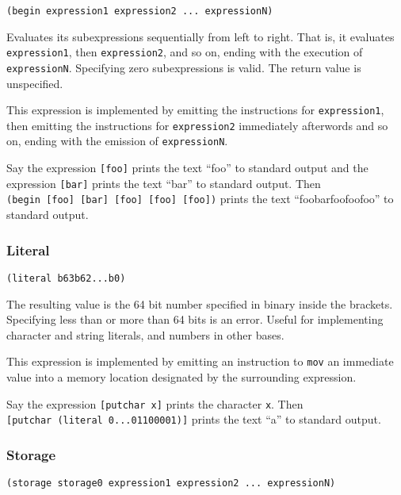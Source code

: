 \documentclass[]{article}
\begin{document}
\begin{verbatim}
(begin expression1 expression2 ... expressionN)
\end{verbatim}

Evaluates its subexpressions sequentially from left to right. That is,
it evaluates \texttt{expression1}, then \texttt{expression2}, and so on,
ending with the execution of \texttt{expressionN}. Specifying zero
subexpressions is valid. The return value is unspecified.

This expression is implemented by emitting the instructions for
\texttt{expression1}, then emitting the instructions for
\texttt{expression2} immediately afterwords and so on, ending with the
emission of \texttt{expressionN}.

Say the expression \texttt{{[}foo{]}} prints the text ``foo'' to
standard output and the expression \texttt{{[}bar{]}} prints the text
``bar'' to standard output. Then
\texttt{(begin\ {[}foo{]}\ {[}bar{]}\ {[}foo{]}\ {[}foo{]}\ {[}foo{]})}
prints the text ``foobarfoofoofoo'' to standard output.

\hypertarget{literal}{\subsubsection{Literal}\label{literal}}

\begin{verbatim}
(literal b63b62...b0)
\end{verbatim}

The resulting value is the 64 bit number specified in binary inside the
brackets. Specifying less than or more than 64 bits is an error. Useful
for implementing character and string literals, and numbers in other
bases.

This expression is implemented by emitting an instruction to
\texttt{mov} an immediate value into a memory location designated by the
surrounding expression.

Say the expression \texttt{{[}putchar\ x{]}} prints the character
\texttt{x}. Then \texttt{{[}putchar\ (literal\ 0...01100001){]}} prints
the text ``a'' to standard output.

\hypertarget{storage}{\subsubsection{Storage}\label{storage}}

\begin{verbatim}
(storage storage0 expression1 expression2 ... expressionN)
\end{verbatim}
\end{document}
